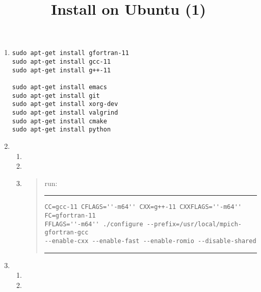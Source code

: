 \documentclass[12pt]{article}
\newcommand{\ttype}[1]{\emC{\LARGE \texttt{#1}}}
\begin{document}
\title{Install on Ubuntu (1)}
\begin{enumerate}
\item
\begin{verbatim}
sudo apt-get install gfortran-11
sudo apt-get install gcc-11
sudo apt-get install g++-11

sudo apt-get install emacs
sudo apt-get install git
sudo apt-get install xorg-dev
sudo apt-get install valgrind
sudo apt-get install cmake
sudo apt-get install python
\end{verbatim}

\item
{}

\begin{enumerate}
\item
{}
\item
{}
\item
{}

\begin{quote}
run:
\hrule
\begin{verbatim}
CC=gcc-11 CFLAGS=''-m64'' CXX=g++-11 CXXFLAGS=''-m64'' FC=gfortran-11
FFLAGS=''-m64'' ./configure --prefix=/usr/local/mpich-gfortran-gcc
--enable-cxx --enable-fast --enable-romio --disable-shared
\end{verbatim}
\hrule
\end{quote}
\end{enumerate}

\item
  \begin{enumerate}
  \item
    \ttype{make}
  \item
    \ttype{make install}
  \end{enumerate}
\end{enumerate}
\end{document}
